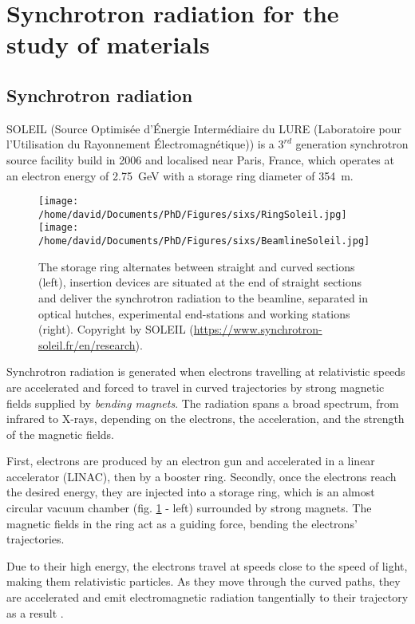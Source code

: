\section{Synchrotron radiation for the study of materials} \label{sec:SIXS}

\subsection{Synchrotron radiation}

SOLEIL (Source Optimisée d’Énergie Intermédiaire du LURE (Laboratoire pour l’Utilisation du Rayonnement Électromagnétique)) is a $3^{rd}$ generation synchrotron source facility build in 2006 and localised near Paris, France, which operates at an electron energy of \qty{2.75}{\GeV} with a storage ring diameter of \qty{354}{\m}.

\begin{figure}[!htb]
    \centering
    \texttt{[image: /home/david/Documents/PhD/Figures/sixs/RingSoleil.jpg]}
    \texttt{[image: /home/david/Documents/PhD/Figures/sixs/BeamlineSoleil.jpg]}
    \caption{
    	The storage ring alternates between straight and curved sections (left), insertion devices are situated at the end of straight sections and deliver the synchrotron radiation to the beamline, separated in optical hutches, experimental end-stations and working stations (right).
    	Copyright by SOLEIL (\url{https://www.synchrotron-soleil.fr/en/research}).
    }
    \label{fig:SOLEIL}
\end{figure}

Synchrotron radiation is generated when electrons travelling at relativistic speeds are accelerated and forced to travel in curved trajectories by strong magnetic fields supplied by \textit{bending magnets}.
The radiation spans a broad spectrum, from infrared to X-rays, depending on the electrons, the acceleration, and the strength of the magnetic fields.

First, electrons are produced by an electron gun and accelerated in a linear accelerator (LINAC), then by a booster ring.
Secondly, once the electrons reach the desired energy, they are injected into a storage ring, which is an almost circular vacuum chamber (fig. \ref{fig:SOLEIL} - left) surrounded by strong magnets.
The magnetic fields in the ring act as a guiding force, bending the electrons' trajectories.

Due to their high energy, the electrons travel at speeds close to the speed of light, making them relativistic particles.
As they move through the curved paths, they are accelerated and emit electromagnetic radiation tangentially to their trajectory as a result \parencite{Willmott, NielsenMcMorrow}.

